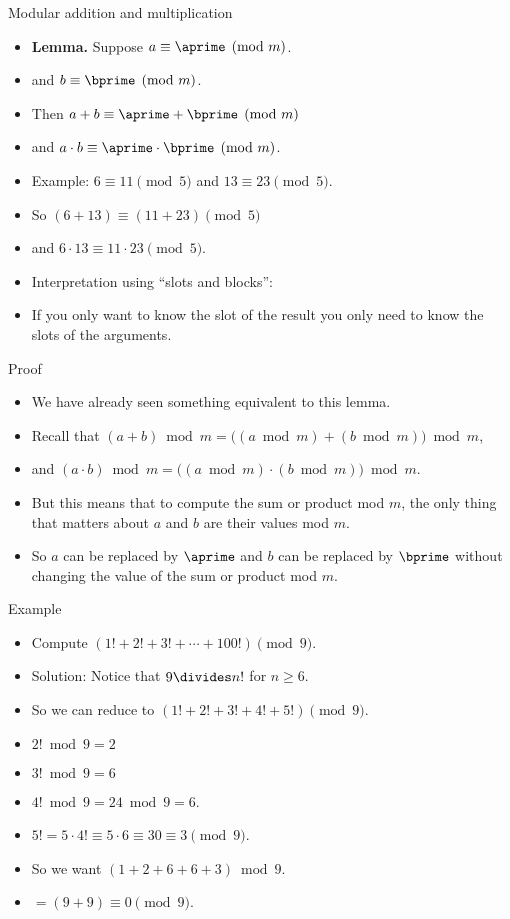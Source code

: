 \documentclass[handout]{beamer}
\begin{document}
\begin{frame}{Modular addition and multiplication}
\begin{itemize}
  \item \textbf{Lemma.} Suppose $a \equiv \aprime \pmod {m}$.
  \item and $b  \equiv \bprime \pmod {m}$.
  \item Then $a+b \equiv \aprime + \bprime \pmod {m}$
  \item and $a \cdot b \equiv \aprime \cdot \bprime \pmod {m}$.
  \item Example: $6 \equiv 11 \pmod 5$ and $13\equiv 23 \pmod 5$.
  \item So $(6+13) \equiv (11 +23) \pmod 5$
  \item and  $6\cdot 13 \equiv 11\cdot 23 \pmod 5$.
  \item Interpretation using ``slots and blocks'':
  \item If you only want to know the slot
  of the result you only need to know the slots of the arguments.
\end{itemize}
\end{frame}

\begin{frame}{Proof}
\begin{itemize}
  \item We have already seen something equivalent to this lemma.
  \item Recall that $(a+b)\bmod m = \big( (a\bmod m) + (b\bmod m) \big) \bmod m$,
  \item and $(a\cdot b)\bmod m = \big( (a\bmod m) \cdot (b\bmod m) \big) \bmod m$.
  \item But this means that to compute the sum or product mod $m$, the only thing that
  matters about $a$ and $b$ are their values mod $m$.
  \item So $a$ can be replaced by
  $\aprime$ and $b$ can be replaced by $\bprime$ without changing the value of
  the sum or product mod $m$.
\end{itemize}
\end{frame}

\begin{frame}{Example}
\begin{itemize}
  \item Compute $(1! + 2! + 3! + \cdots + 100!) \pmod 9$.
  \item Solution: Notice that $9\divides n!$ for $n\geq 6$.
  \item So we can reduce to $(1! + 2! + 3! + 4! + 5!) \pmod 9$.
  \item $2! \bmod 9 = 2$
  \item $3! \bmod 9 = 6$
  \item $4! \bmod 9 = 24 \bmod 9 = 6$.
  \item $5! = 5 \cdot 4! \equiv 5 \cdot 6 \equiv 30 \equiv 3 \pmod 9$.
  \item So we want $(1 + 2 + 6 + 6 + 3) \bmod 9$.
  \item $=(9+9) \equiv 0 \pmod 9$.
\end{itemize}
\end{frame}
\end{document}

